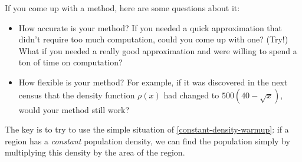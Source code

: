 \documentclass[main]{subfiles}
\begin{document}
\begin{enumerate}
  \begin{problemonly}
    If you come up with a method, here are some questions about it: 
    \begin{itemize}
    \item How accurate is your method?  If you needed a quick
      approximation that didn't require too much computation, could you
      come up with one?  (Try!)  What if you needed a really good
      approximation and were willing to spend a ton of time on
      computation? 
    \item How flexible is your method?  For example, if it was discovered
      in the next census that the density function $\rho(x)$ had changed
      to $500 (40 - \sqrt{x})$, would your method still work?
    \end{itemize}
  \end{problemonly}

  \begin{solution}
    The key is to try to use the simple situation of
    \ref{constant-density-warmup}: if a region has a \textit{constant}
    population density, we can find the population simply by multiplying
    this density by the area of the region.


\end{solution}
\end{enumerate}
\end{document}
